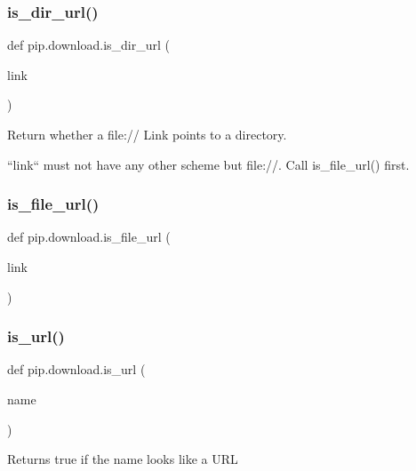 \subsubsection{\texorpdfstring{is\+\_\+dir\+\_\+url()}{is\_dir\_url()}}
{\footnotesize\ttfamily def pip.\+download.\+is\+\_\+dir\+\_\+url (\begin{DoxyParamCaption}\item[{}]{link }\end{DoxyParamCaption})}

\begin{DoxyVerb}Return whether a file:// Link points to a directory.

``link`` must not have any other scheme but file://. Call is_file_url()
first.\end{DoxyVerb}
 \mbox{\label{namespacepip_1_1download_ac03d1f30794f44be8cac701ef45c54de}} 
\subsubsection{\texorpdfstring{is\+\_\+file\+\_\+url()}{is\_file\_url()}}
{\footnotesize\ttfamily def pip.\+download.\+is\+\_\+file\+\_\+url (\begin{DoxyParamCaption}\item[{}]{link }\end{DoxyParamCaption})}

\mbox{\label{namespacepip_1_1download_afec89d460aaf7de168f8f2423dbb08b0}} 
\subsubsection{\texorpdfstring{is\+\_\+url()}{is\_url()}}
{\footnotesize\ttfamily def pip.\+download.\+is\+\_\+url (\begin{DoxyParamCaption}\item[{}]{name }\end{DoxyParamCaption})}

\begin{DoxyVerb}Returns true if the name looks like a URL\end{DoxyVerb}
 \mbox{\label{namespacepip_1_1download_a178d555d11b1cca09822a4d4ef5bac64}} 
